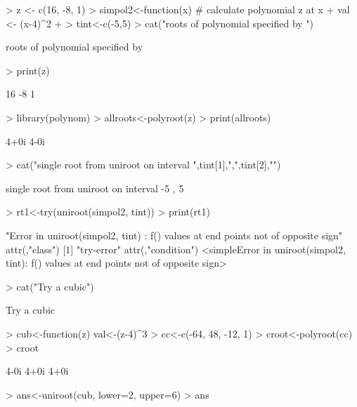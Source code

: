 \documentclass[11pt,letterpaper]{article}
\begin{document}
\begin{Schunk}
\begin{Sinput}
> z <- c(16, -8, 1)
> simpol2<-function(x){ # calculate polynomial z at x 
+    val <- (x-4)^2
+ }
> tint<-c(-5,5)
> cat("roots of polynomial specified by ")
\end{Sinput}
\begin{Soutput}
roots of polynomial specified by 
\end{Soutput}
\begin{Sinput}
> print(z)
\end{Sinput}
\begin{Soutput}
[1] 16 -8  1
\end{Soutput}
\begin{Sinput}
> library(polynom)
> allroots<-polyroot(z)
> print(allroots)
\end{Sinput}
\begin{Soutput}
[1] 4+0i 4-0i
\end{Soutput}
\begin{Sinput}
> cat("single root from uniroot on interval ",tint[1],",",tint[2],"\n")
\end{Sinput}
\begin{Soutput}
single root from uniroot on interval  -5 , 5 
\end{Soutput}
\begin{Sinput}
> rt1<-try(uniroot(simpol2, tint))
> print(rt1)
\end{Sinput}
\begin{Soutput}
[1] "Error in uniroot(simpol2, tint) : \n  f() values at end points not of opposite sign\n"
attr(,"class")
[1] "try-error"
attr(,"condition")
<simpleError in uniroot(simpol2, tint): f() values at end points not of opposite sign>
\end{Soutput}
\begin{Sinput}
> cat("\n Try a cubic\n")
\end{Sinput}
\begin{Soutput}
 Try a cubic
\end{Soutput}
\begin{Sinput}
> cub<-function(z) {val<-(z-4)^3}
> cc<-c(-64, 48, -12, 1)
> croot<-polyroot(cc)
> croot
\end{Sinput}
\begin{Soutput}
[1] 4-0i 4+0i 4+0i
\end{Soutput}
\begin{Sinput}
> ans<-uniroot(cub, lower=2, upper=6)
> ans
\end{Sinput}
\end{Schunk}
\end{document}
